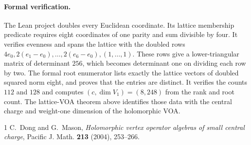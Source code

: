 \documentclass[11pt]{article}
\begin{document}
\paragraph{Formal verification.}
The Lean project doubles every Euclidean coordinate. Its lattice
membership predicate requires eight coordinates of one parity and sum
divisible by four. It verifies evenness and spans the lattice with the
doubled rows \(4e_0,2(e_1-e_0),\ldots,2(e_6-e_0),(1,\ldots,1)\).
These rows give a lower-triangular matrix of determinant \(256\), which
becomes determinant one on dividing each row by two. The formal root
enumerator lists exactly the lattice vectors of doubled squared norm
eight, and proves that the entries are distinct. It verifies the counts
\(112\) and \(128\) and computes \((c,\dim V_1)=(8,248)\) from the rank
and root count. The lattice-VOA theorem above identifies those data with
the central charge and weight-one dimension of the holomorphic VOA.

\begin{thebibliography}{1}
C.~Dong and G.~Mason, \emph{Holomorphic vertex operator algebras of small
central charge}, Pacific J. Math. \textbf{213} (2004), 253--266.
\end{thebibliography}
\end{document}
